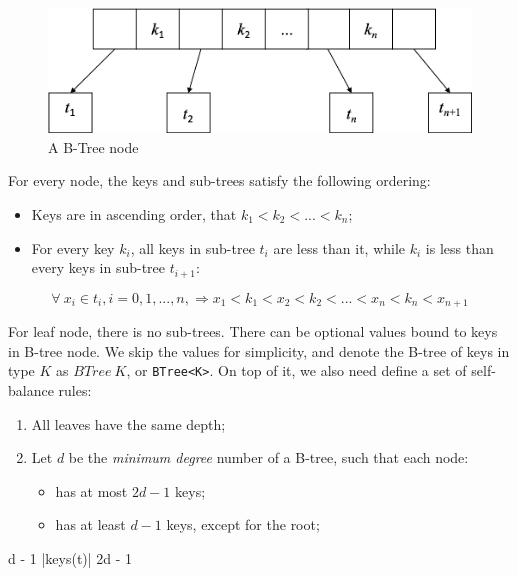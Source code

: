 \documentclass[b5paper]{article}
\begin{document}
\begin{figure}[htbp]
  \centering
  \includegraphics[scale=0.5]{img/btree-node.png}
  \caption{A B-Tree node}
  \label{fig:btree-node}
\end{figure}

For every node, the keys and sub-trees satisfy the following ordering:

\begin{itemize}
\item Keys are in ascending order, that $k_1 < k_2 < ... < k_n$;
\item For every key $k_i$, all keys in sub-tree $t_i$ are less than it, while $k_i$ is less than every keys in sub-tree $t_{i+1}$:
\end{itemize}

\begin{equation}
\forall\ x_i \in t_i, i=0, 1, ..., n, \Rightarrow x_1 < k_1 < x_2 < k_2 < ... < x_n < k_n < x_{n+1}
\label{eq:btree-order}
\end{equation}

For leaf node, there is no sub-trees. There can be optional values bound to keys in B-tree node. We skip the values for simplicity, and denote the B-tree of keys in type $K$ as $BTree\ K$, or \texttt{BTree<K>}. On top of it, we also need define a set of self-balance rules:

\begin{enumerate}
\item All leaves have the same depth;
\item Let $d$ be the {\em minimum degree} number of a B-tree, such that each node:
  \begin{itemize}
  \item has at most $2d - 1$ keys;
  \item has at least $d - 1$ keys, except for the root;
  \end{itemize}
\end{enumerate}

\be
  d - 1 \leq |keys(t)|  \leq 2d - 1
\ee
\end{document}
